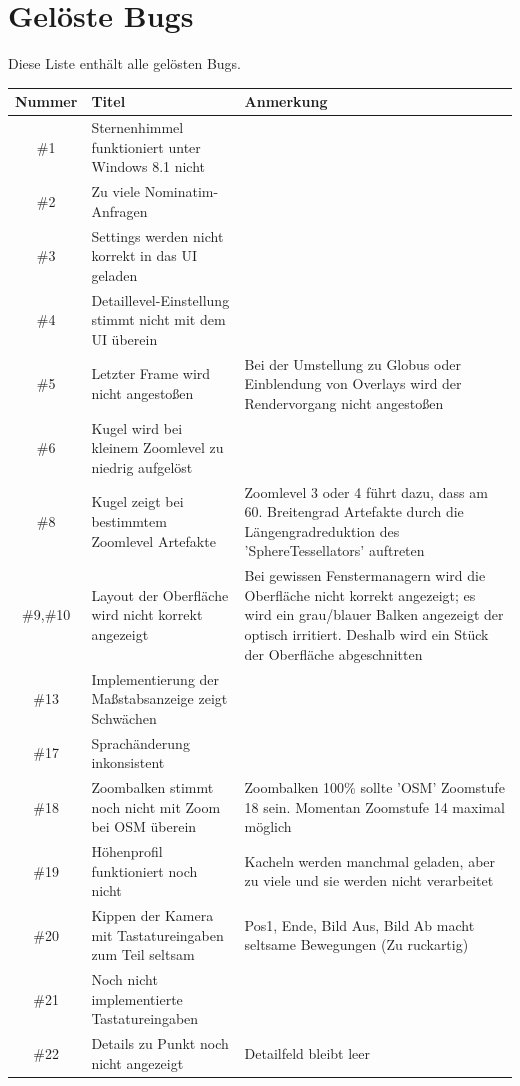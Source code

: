 \documentclass[10pt]{scrreprt}
\begin{document}
\section{Gelöste Bugs}
Diese Liste enthält alle gelösten Bugs.
\begin{longtable}{|c|p{5.2cm}|p{8.2cm}|}
\hline
Nummer & Titel & Anmerkung \\
\hline
\hline
\#1 & Sternenhimmel funktioniert unter Windows 8.1 nicht & \\
\hline
\#2 & Zu viele Nominatim-Anfragen &  \\
\hline
\#3 & Settings werden nicht korrekt in das UI geladen & \\
\hline
\#4 & Detaillevel-Einstellung stimmt nicht mit dem UI überein &  \\
\hline
\#5 & Letzter Frame wird nicht angestoßen & Bei der Umstellung zu Globus oder Einblendung von Overlays wird der Rendervorgang nicht angestoßen \\
\hline
\#6 & Kugel wird bei kleinem Zoomlevel zu niedrig aufgelöst & \\
\hline
\#8 & Kugel zeigt bei bestimmtem Zoomlevel Artefakte & Zoomlevel 3 oder 4 führt dazu, dass am 60. Breitengrad Artefakte durch die Längengradreduktion des 'SphereTessellators' auftreten \\
\hline
\#9,\#10 & Layout der Oberfläche wird nicht korrekt angezeigt & Bei gewissen Fenstermanagern wird die Oberfläche nicht korrekt angezeigt; es wird ein grau/blauer Balken angezeigt der optisch irritiert. Deshalb wird ein Stück der Oberfläche abgeschnitten \\
\hline
\#13 & Implementierung der Maßstabsanzeige zeigt Schwächen & \\
\hline
\#17 & Sprachänderung inkonsistent & \\
\hline
\#18 & Zoombalken stimmt noch nicht mit Zoom bei OSM überein & Zoombalken 100\% sollte 'OSM' Zoomstufe 18 sein. Momentan Zoomstufe 14 maximal möglich\\
\hline
\#19 & Höhenprofil funktioniert noch nicht & Kacheln werden manchmal geladen, aber zu viele und sie werden nicht verarbeitet \\
\hline
\#20 & Kippen der Kamera mit Tastatureingaben zum Teil seltsam & Pos1, Ende, Bild Aus, Bild Ab macht seltsame Bewegungen (Zu ruckartig) \\
\hline
\#21 & Noch nicht implementierte Tastatureingaben & \\
\hline
\#22 & Details zu Punkt noch nicht angezeigt & Detailfeld bleibt leer \\

\end{longtable}
\end{document}
